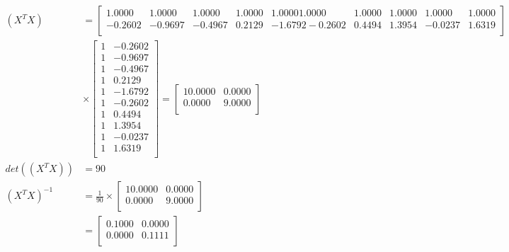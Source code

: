 \documentclass[12pt]{article}
\begin{document}
\begin{center}
    \begin{align*}
        \left(X^{T} X\right) &=
        \begin{bmatrix}
            1.0000  &  1.0000 &   1.0000   & 1.0000  &  1.0000    1.0000  &  1.0000 &   1.0000   & 1.0000  &  1.0000 \\
            -0.2602 &   -0.9697  & -0.4967 &   0.2129 &  -1.6792   -0.2602  &  0.4494 &   1.3954  & -0.0237 &   1.6319 \\
        \end{bmatrix}
        \\
        & \times
        \begin{bmatrix}
            1 & -0.2602 \\
            1 & -0.9697 \\
            1 & -0.4967 \\
            1 & 0.2129 \\
            1 & -1.6792 \\
            1 & -0.2602 \\
            1 & 0.4494 \\
            1 & 1.3954 \\
            1 & -0.0237 \\
            1 & 1.6319 \\
        \end{bmatrix}
        =
        \begin{bmatrix}
            10.0000  &  0.0000\\
            0.0000 &   9.0000\\
        \end{bmatrix}
        \\[0.1 in]
        det(\left(X^{T} X\right)) &= 90
        \\[0.1 in]
        \left(X^{T} X\right)^{-1} &= \frac{1}{90} 
        \times
        \begin{bmatrix}
            10.0000  &  0.0000\\
            0.0000 &   9.0000\\
        \end{bmatrix}
        \\ &= 
        \begin{bmatrix}
            0.1000 &  0.0000\\
            0.0000  &  0.1111\\
        \end{bmatrix}
        \\[0.1 in]

\end{align*}
\end{center}
\end{document}
